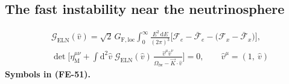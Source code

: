\documentclass[
  10pt,
]{article}
\begin{document}
\hypertarget{the-fast-instability-near-the-neutrinosphere}{%
\subsection{The fast instability near the
neutrinosphere}\label{the-fast-instability-near-the-neutrinosphere}}

\[
\begin{aligned}
&\mathcal{G}_{\mathrm{ELN}}(\hat v) = \sqrt2\,G_{\mathrm{F,loc}}\int_0^\infty\frac{E^2\,\mathrm{d}E}{(2\pi)^3}\Big[\mathcal{F}_{e} - \bar{\mathcal{F}}_{e}
 - \big(\mathcal{F}_{x} - \bar{\mathcal{F}}_{x}\big)\Big],\\
&\det\Big[\eta_{\mathrm{M}}^{\mu\nu} + \int\mathrm{d}^2\hat v\;\mathcal{G}_{\mathrm{ELN}}(\hat v)\,
 \frac{\hat v^\mu\hat v^\nu}{\Omega_{\mathrm{fw}} - \vec K\cdot\hat v}\Big] = 0,\qquad \hat v^\mu = (1,\ \hat v)
\end{aligned} \tag{FE-51}
\] \textbf{Symbols in (FE-51).}
\end{document}

